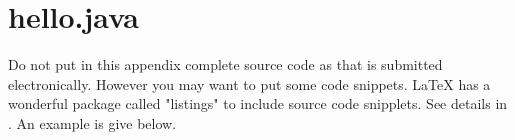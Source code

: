\documentclass[12pt, a4paper]{report}
\begin{document}
\appendix
\chapter{hello.java}
Do not put in this appendix complete source code as that is submitted electronically. However you may want to put some code snippets.  \LaTeX{} has a wonderful package called "listings" to include source code snipplets. See details in \cite{Wikipedi2016a}. An example is give below.





%

		
\end{document}
